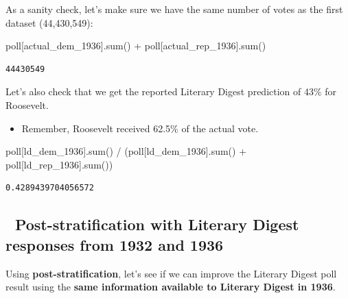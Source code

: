 \documentclass[
  letterpaper,
  DIV=11,
  numbers=noendperiod]{scrreprt}
\newenvironment{Shaded}{\begin{snugshade}}{\end{snugshade}}
\newcommand{\BuiltInTok}[1]{\textcolor[rgb]{0.00,0.23,0.31}{#1}}
\newcommand{\NormalTok}[1]{\textcolor[rgb]{0.00,0.23,0.31}{#1}}
\newcommand{\OperatorTok}[1]{\textcolor[rgb]{0.37,0.37,0.37}{#1}}
\newcommand{\StringTok}[1]{\textcolor[rgb]{0.13,0.47,0.30}{#1}}
\providecommand{\tightlist}{%
  \setlength{\itemsep}{0pt}\setlength{\parskip}{0pt}}\usepackage{longtable,booktabs,array}
\begin{document}
As a sanity check, let's make sure we have the same number of votes as
the first dataset (44,430,549):

\begin{Shaded}
\begin{Highlighting}[]
\NormalTok{poll[}\StringTok{\textquotesingle{}actual\_dem\_1936\textquotesingle{}}\NormalTok{].}\BuiltInTok{sum}\NormalTok{() }\OperatorTok{+}\NormalTok{ poll[}\StringTok{\textquotesingle{}actual\_rep\_1936\textquotesingle{}}\NormalTok{].}\BuiltInTok{sum}\NormalTok{()}
\end{Highlighting}
\end{Shaded}

\begin{verbatim}
44430549
\end{verbatim}

Let's also check that we get the reported Literary Digest prediction of
43\% for Roosevelt.

\begin{itemize}
\tightlist
\item
  Remember, Roosevelt received 62.5\% of the actual vote.
\end{itemize}

\begin{Shaded}
\begin{Highlighting}[]
\NormalTok{poll[}\StringTok{\textquotesingle{}ld\_dem\_1936\textquotesingle{}}\NormalTok{].}\BuiltInTok{sum}\NormalTok{() }\OperatorTok{/}\NormalTok{ (poll[}\StringTok{\textquotesingle{}ld\_dem\_1936\textquotesingle{}}\NormalTok{].}\BuiltInTok{sum}\NormalTok{() }\OperatorTok{+}\NormalTok{ poll[}\StringTok{\textquotesingle{}ld\_rep\_1936\textquotesingle{}}\NormalTok{].}\BuiltInTok{sum}\NormalTok{())}
\end{Highlighting}
\end{Shaded}

\begin{verbatim}
0.4289439704056572
\end{verbatim}

\subsection{🥞 Post-stratification with Literary Digest responses from
1932 and
1936}\label{post-stratification-with-literary-digest-responses-from-1932-and-1936}

Using \textbf{post-stratification}, let's see if we can improve the
Literary Digest poll result using the \textbf{same information available
to Literary Digest in 1936}.
\end{document}
